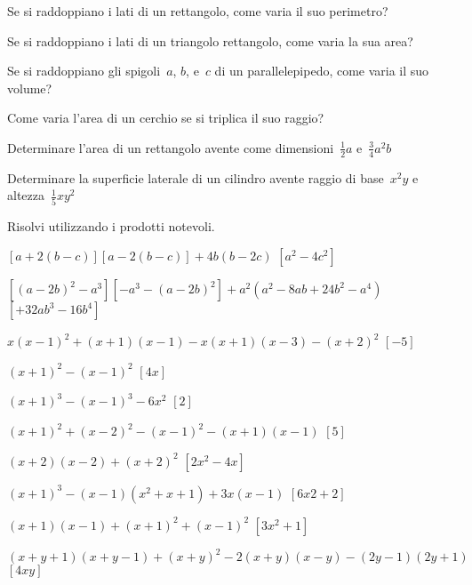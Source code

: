 \begin{multicols}{2}
\begin{esercizio}
\label{ese:10.36}
 Se si raddoppiano i lati di un rettangolo, come varia il suo
perimetro?
\end{esercizio}

\begin{esercizio}
\label{ese:10.37}
 Se si raddoppiano i lati di un triangolo rettangolo, come varia la sua
area?
\end{esercizio}

\begin{esercizio}
\label{ese:10.38}
 Se si raddoppiano gli spigoli~$a$, $b$, e~$c$ di un parallelepipedo, come
varia il suo volume?
\end{esercizio}

\begin{esercizio}
\label{ese:10.39}
 Come varia l'area di un cerchio se si triplica il suo
raggio?
\end{esercizio}

\begin{esercizio}
\label{ese:10.40}
 Determinare l'area di un rettangolo avente come
dimensioni~$\frac{1}{2}a$ e~$\frac{3}{4}a^{2}b$
\end{esercizio}

\begin{esercizio}
\label{ese:10.41}
 Determinare la superficie laterale di un cilindro avente raggio di
base~$x^{2}y$ e altezza~$\frac{1}{5}{xy}^{2}$
\end{esercizio}
\end{multicols}

\begin{esercizio}[\Ast]
 \label{ese:11.31}
Risolvi utilizzando i prodotti notevoli.
 \begin{enumeratea}
 \item 
$\left[a+2\left(b-c\right)\right]\left[a-2\left(b-c\right)\right]+4b(b-2c)$
  \hfill $\left[a^{2}-4c^{2}\right]$
 \item 
$\left[\left(a-2b\right)^{2}-a^{3}\right]\left[-a^{3}-\left(a-2b\right)^2\right]
+a^{2}(a^{2}-8{ab}+24b^{2}-a^{4})$
  \hfill $\left[+32ab^{3}-16b^{4}\right]$
 \item $x(x-1)^{2}+(x+1)(x-1)-x(x+1)(x-3)-(x+2)^{2}$
  \hfill $\left[-5\right]$
 \item $(x+1)^{2}-(x-1)^{2}$
  \hfill $\left[4x\right]$
 \item $(x+1)^{3}-(x-1)^{3}-6x^2$
  \hfill $\left[2\right]$
 \item $(x+1)^{2}+(x-2)^{2}-(x-1)^{2}-(x+1)(x-1)$
  \hfill $\left[5\right]$
 \item $(x+2)(x-2)+(x+2)^{2}$
  \hfill $\left[2x^{2}-4x\right]$
 \item $(x+1)^{3}-(x-1)\left(x^{2}+x+1\right)+3x(x-1)$
  \hfill $\left[6x{2}+2\right]$
 \item $(x+1)(x-1)+(x+1)^{2}+(x-1)^{2}$
  \hfill $\left[3x^{2}+1\right]$
 \item $(x+y+1)(x+y-1)+(x+y)^{2}-2(x+y)(x-y)-(2y-1)(2y+1)$
  \hfill $\left[4xy\right]$
 \end{enumeratea}
\end{esercizio}

